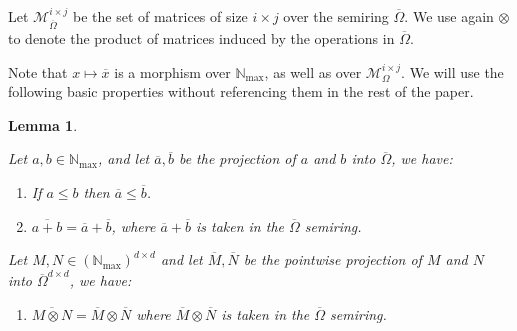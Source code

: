\documentclass[10pt,a4paper]{amsart}
\newtheorem{lem}[lem]{Lemma}
\theoremstyle{definition}
\numberwithin{equation}{section}
\theoremstyle{remark}
\newcommand{\N}{\mathbb{N}}
\newcommand{\Nmax}{\N_{\max}}
\newcommand{\matricesOm}[2]{\mathcal{M}^{#1 \times #2}_\Omega}
\newcommand{\matricesOmbar}[2]{\mathcal{M}_{\overline{\Omega}}^{#1\times #2}}
\theoremstyle{remark}
\begin{document}
Let $\matricesOmbar{i}{j}$ be the set of matrices of size $i \times j$ over the semiring $\overline{\Omega}$. We use again $\otimes$ to denote the product of matrices induced by the operations in $\overline{\Omega}$.

Note that $x \mapsto \overline{x}$ is a morphism over $\Nmax$, as well as over $\matricesOm{i}{j}$. We will use the following basic properties without referencing them in the rest of the paper.

\begin{lem}\hfill
\label{lemma:propertyofbar}

\noindent Let $a,b\in \Nmax$, and let $\overline{a},\overline{b}$ be the projection of $a$ and $b$ into $\overline{\Omega}$, we have:
\begin{enumerate}[label={\normalfont(\arabic*)}]
\item If $a\le b$ then $\overline{a}\le \overline{b}$.
\item $\overline{a + b} = \overline{a} + \overline{b}$, where $\overline{a}+\overline{b}$ is taken  in the $\overline{\Omega}$ semiring.
\end{enumerate}
Let $M,N\in (\Nmax)^{d\times d}$ and let $\overline{M},\overline{N}$ be the pointwise projection of $M$ and $N$ into $\overline{\Omega}^{d\times d}$, we have:
\begin{enumerate}[resume,label={\normalfont(\arabic*)}]
\item $\overline{M\otimes N} = \overline{M}\otimes\overline{N}$ where $\overline{M}\otimes\overline{N}$ is taken  in the $\overline{\Omega}$ semiring.
\end{enumerate}
\end{lem}
\end{document}
